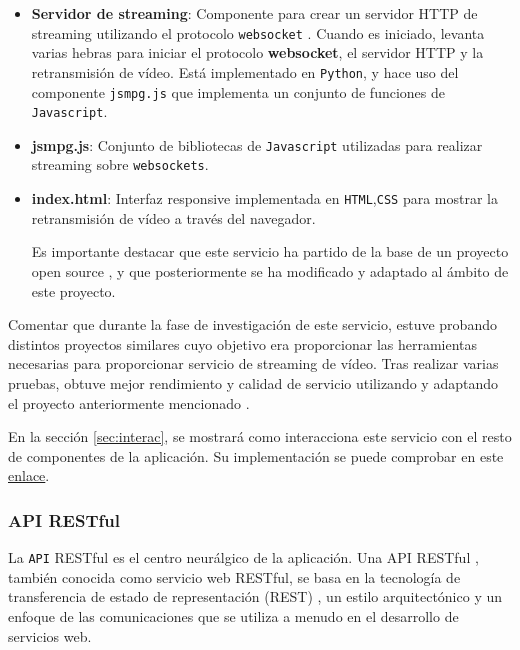 \begin{itemize}

\item \textbf{Servidor de streaming}: Componente para crear un servidor HTTP de streaming utilizando el protocolo \texttt{websocket} \cite{ref28}. Cuando es iniciado, levanta varias hebras para iniciar el protocolo \textbf{websocket}, el servidor HTTP y la retransmisión de vídeo. Está implementado en \texttt{Python}, y hace uso del componente \texttt{jsmpg.js} que implementa un conjunto de funciones de \texttt{Javascript}.

\item \textbf{jsmpg.js}: Conjunto de bibliotecas de \texttt{Javascript} utilizadas para realizar streaming sobre \texttt{websockets}.

\item \textbf{index.html}: Interfaz responsive implementada en \texttt{HTML},\texttt{CSS} para mostrar la retransmisión de vídeo a través del navegador. 

Es importante destacar que este servicio ha partido de la base de un proyecto open source \cite{ref29}, y que posteriormente se ha modificado y adaptado al ámbito de este proyecto.

\end{itemize}

Comentar que durante la fase de investigación de este servicio, estuve probando distintos proyectos similares cuyo objetivo era proporcionar las herramientas necesarias para proporcionar servicio de streaming de vídeo. Tras realizar varias pruebas, obtuve mejor rendimiento y calidad de servicio utilizando y adaptando el proyecto anteriormente mencionado \cite{ref29}.

En la sección \ref{sec:interac}, se mostrará como interacciona este servicio con el resto de componentes de la aplicación. Su implementación se puede comprobar en este \href{https://github.com/jmv74211/TFM_security_system_PI/tree/master/src/modules/pistream}{enlace}.

\subsubsection{API RESTful}

La \texttt{API} RESTful es el centro neurálgico de la aplicación. Una API RESTful \cite{ref30}, también conocida como servicio web RESTful, se basa en la tecnología de transferencia de estado de representación (REST) \cite{ref30}, un estilo arquitectónico y un enfoque de las comunicaciones que se utiliza a menudo en el desarrollo de servicios web.


